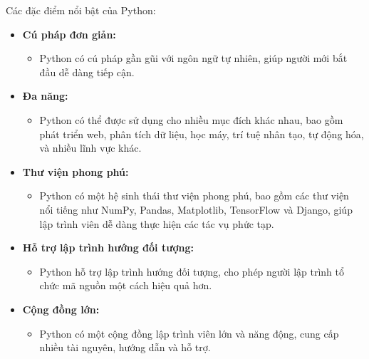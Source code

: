 Các đặc điểm nổi bật của Python:
\begin{itemize}
    \item \textbf{Cú pháp đơn giản:}
    \begin{itemize}
        \item Python có cú pháp gần gũi với ngôn ngữ tự nhiên, giúp người mới bắt đầu dễ dàng tiếp cận.
    \end{itemize}
    \item \textbf{Đa năng:}
    \begin{itemize}
        \item Python có thể được sử dụng cho nhiều mục đích khác nhau, bao gồm phát triển web, phân tích dữ liệu, học máy, trí tuệ nhân tạo, tự động hóa, và nhiều lĩnh vực khác.
    \end{itemize}
    \item \textbf{Thư viện phong phú:}
    \begin{itemize}
        \item Python có một hệ sinh thái thư viện phong phú, bao gồm các thư viện nổi tiếng như NumPy, Pandas, Matplotlib, TensorFlow và Django, giúp lập trình viên dễ dàng thực hiện các tác vụ phức tạp.
    \end{itemize}
    \item \textbf{Hỗ trợ lập trình hướng đối tượng:}
    \begin{itemize}
        \item Python hỗ trợ lập trình hướng đối tượng, cho phép người lập trình tổ chức mã nguồn một cách hiệu quả hơn.
    \end{itemize}
    \item \textbf{Cộng đồng lớn:}
    \begin{itemize}
        \item Python có một cộng đồng lập trình viên lớn và năng động, cung cấp nhiều tài nguyên, hướng dẫn và hỗ trợ.
    \end{itemize}
\end{itemize}

